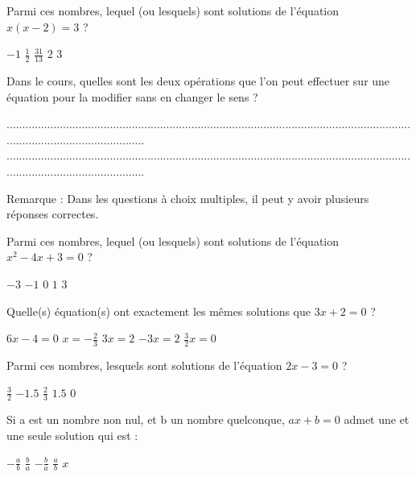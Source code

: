\documentclass[10pt,a4paper]{exam}
\begin{document}
Parmi ces nombres, lequel (ou lesquels) sont solutions de l'équation   $x(x-2) = 3$ ?\newline
\begin{oneparcheckboxes}
   \choice $-1$
   \choice $\frac{1}{2}$
   \choice $\frac{31}{13}$
   \choice $2$
   \choice $3$
\end{oneparcheckboxes}
 
Dans le cours, quelles sont les deux opérations que l'on peut effectuer sur une équation pour la modifier sans en changer le sens ?

.............................................................................................................................................................................\newline
.............................................................................................................................................................................
 
 \newpage
 
 
Remarque : Dans les questions à choix multiples, il peut y avoir plusieurs réponses correctes.

Parmi ces nombres, lequel (ou lesquels) sont solutions de l'équation   $x^2 - 4x + 3 = 0$ ?\newline
\begin{oneparcheckboxes}
   \choice $-3$
   \choice $-1$
   \choice $0$
   \choice $1$
   \choice $3$
\end{oneparcheckboxes}

 
Quelle(s) équation(s) ont exactement les mêmes solutions que $3x+2=0$ ?\newline
\begin{oneparcheckboxes}
   \choice $6x-4=0$
   \choice $x= -\frac{2}{3}$
   \choice $3x = 2$
   \choice $-3x = 2$
   \choice $\frac{3}{2}x= 0$
\end{oneparcheckboxes}
 

Parmi ces nombres, lesquels sont solutions de l'équation   $2x-3=0$ ?\newline
\begin{oneparcheckboxes}
   \choice $\frac{3}{2}$
   \choice $-1.5$
   \choice $\frac{2}{3}$
   \choice $1.5$
   \choice $0$
\end{oneparcheckboxes}
 

Si a est un nombre non nul, et b un nombre quelconque, $ax+b=0$  admet une et une seule solution qui est :\newline
\begin{oneparcheckboxes}
   \choice $-\frac{a}{b}$
   \choice $\frac{b}{a}$
   \choice $-\frac{b}{a}$
   \choice $\frac{a}{b}$
   \choice $x$
\end{oneparcheckboxes}
 
\end{document}
